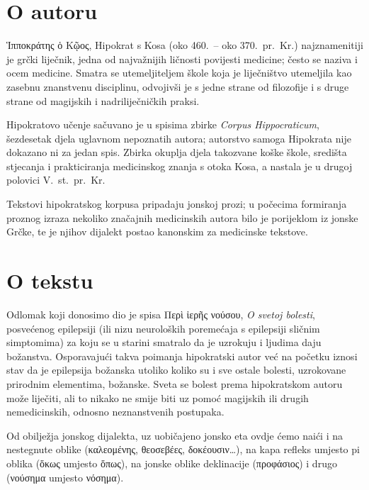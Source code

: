 \section*{O autoru}

Ἱπποκράτης ὁ Κῷος, Hipokrat s Kosa (oko 460.\ – oko 370.\ pr.~Kr.) najznamenitiji je grčki liječnik, jedna od najvažnijih ličnosti povijesti medicine; često se naziva i ocem medicine. Smatra se utemeljiteljem škole koja je liječništvo utemeljila kao zasebnu znanstvenu disciplinu, odvojivši je s jedne strane od filozofije i s druge strane od magijskih i nadriliječničkih praksi. 

Hipokratovo učenje sačuvano je u spisima zbirke \textit{Corpus Hippocraticum}, šezdesetak djela uglavnom nepoznatih autora; autorstvo samoga Hipokrata nije dokazano ni za jedan spis. Zbirka okuplja djela takozvane koške škole, središta stjecanja i prakticiranja medicinskog znanja s otoka Kosa, a nastala je u drugoj polovici V.~st.\ pr.~Kr.

Tekstovi hipokratskog korpusa pripadaju jonskoj prozi; u počecima formiranja proznog izraza nekoliko značajnih medicinskih autora bilo je porijeklom iz jonske Grčke, te je njihov dijalekt postao kanonskim za medicinske tekstove. 

\section*{O tekstu}

Odlomak koji donosimo dio je spisa \textgreek[variant=ancient]{Περὶ ἱερῆς νούσου,} \textit{O svetoj bolesti}, posvećenog epilepsiji (ili nizu neuroloških poremećaja s epilepsiji sličnim simptomima) za koju se u starini smatralo da je uzrokuju i ljudima daju božanstva. Osporavajući takva poimanja hipokratski autor već na početku iznosi stav da je epilepsija božanska utoliko koliko su i sve ostale bolesti, uzrokovane prirodnim elementima, božanske. Sveta se bolest prema hipokratskom autoru može liječiti, ali to nikako ne smije biti uz pomoć magijskih ili drugih nemedicinskih, odnosno neznanstvenih postupaka.

Od obilježja jonskog dijalekta, uz uobičajeno jonsko eta ovdje ćemo naići i na nestegnute oblike \textgreek[variant=ancient]{(καλεομένης, θεοσεβέες, δοκέουσιν\dots),} na kapa refleks umjesto pi oblika \textgreek[variant=ancient]{(ὅκως} umjesto \textgreek[variant=ancient]{ὅπως),} na jonske oblike deklinacije \textgreek[variant=ancient]{(προφάσιος)} i drugo \textgreek[variant=ancient]{(νούσημα} umjesto \textgreek[variant=ancient]{νόσημα).}

